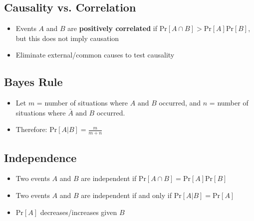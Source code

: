 \documentclass{article}\usepackage{amsmath,amssymb,amsthm,tikz,tkz-graph,color,chngpage,soul,hyperref,csquotes,graphicx,floatrow, listings}\newcommand*{\QEDB}{\hfill\ensuremath{\square}}\newtheorem*{prop}{Proposition}\renewcommand{\theenumi}{\alph{enumi}}\usepackage[shortlabels]{enumitem}\usepackage[nobreak=true]{mdframed}\usetikzlibrary{matrix,calc}\MakeOuterQuote{"}\usepackage[margin=0.75in]{geometry} \newtheorem{theorem}{Theorem}\newcommand{\Z}{\mathbb Z}\newcommand{\R}{\mathbb R}\newcommand{\Q}{\mathbb Q}\newcommand{\N}{\mathbb N}\newcommand{\x}[1]{\textrm{ #1 }}\newcommand{\pr}{\textrm{Pr}}
\begin{document}
\subsection*{Causality vs. Correlation}
\begin{itemize}
    \item Events $A$ and $B$ are \textbf{positively correlated} if $\pr[A\cap B] > \pr[A]\pr[B]$, but this does not imply causation
    \item Eliminate external/common causes to test causality
\end{itemize}
\subsection*{Bayes Rule}
\begin{itemize}
    \item Let $m$ = number of situations where $A \x{and} B$ occurred, and $n$ = number of situations where $\bar{A} \x{and} B$ occurred.
    \item Therefore: $\pr[A|B]=\frac{m}{m+n}$
\end{itemize}
\subsection*{Independence}
\begin{itemize}
    \item Two events $A$ and $B$ are independent if $\pr[A\cap B]=\pr[A]\pr[B]$
    \item Two events $A$ and $B$ are independent if and only if $\pr[A|B]=\pr[A]$
    \item $\pr[A]$ decreases/increases given $B$
\end{itemize}
\end{document}
